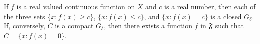 If $f$ is a real valued continuous function on $X$ and $c$ is a real number, then each of the three sets $\{x: f(x) \geq c\}$, $\{x: f(x) \leq c\}$, and $\{x: f(x) = c\}$ is a closed $G_{\delta}$. If, conversely, $C$ is a compact $G_{\delta}$, then there exists a function $f$ in $\mathfrak{F}$ such that $C = \{x: f(x) = 0\}$.
